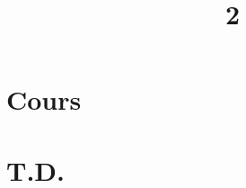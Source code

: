 \documentclass[a4paper]{article}
\title{2}{Algèbre linéaire}
\begin{document}
	\part{Cours}
	
	
	
	
	
	
	\clearpage\null\clearpage
	
	\clearpage\null\clearpage
	\renewcommand{\thesection}{}
	\renewcommand{\thesubsection}{}
	\part{T.D.}
	
	
\end{document}
